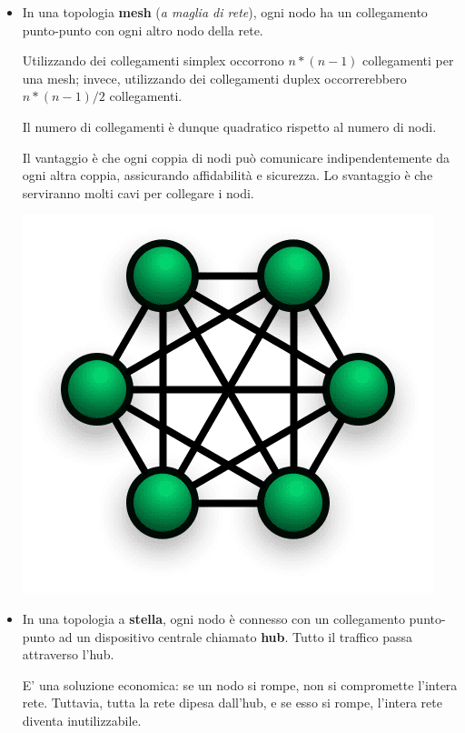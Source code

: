         \begin{itemize}
            \item 
            In una topologia \textbf{mesh} (\textit{a maglia di rete}), ogni nodo ha un collegamento punto-punto con ogni altro nodo della rete. 
            
            Utilizzando dei collegamenti simplex occorrono \(n*(n-1)\) collegamenti per una mesh; invece, utilizzando dei collegamenti duplex occorrerebbero \(n*(n-1)/2\) collegamenti.
            
            Il numero di collegamenti è dunque quadratico rispetto al numero di nodi.
            
            Il vantaggio è che ogni coppia di nodi può comunicare indipendentemente da ogni altra coppia, assicurando affidabilità e sicurezza. Lo svantaggio è che serviranno molti cavi per collegare i nodi.
            
            \begin{center}
                \includegraphics[scale=0.25]{images/MeshNetwork.png}
            \end{center}
            
            \item
            In una topologia a \textbf{stella}, ogni nodo è connesso con un collegamento punto-punto ad un dispositivo centrale chiamato \textbf{hub}. Tutto il traffico passa attraverso l'hub.
            
            E' una soluzione economica: se un nodo si rompe, non si compromette l'intera rete. Tuttavia, tutta la rete dipesa dall'hub, e se esso si rompe, l'intera rete diventa inutilizzabile.
            

\end{itemize}
